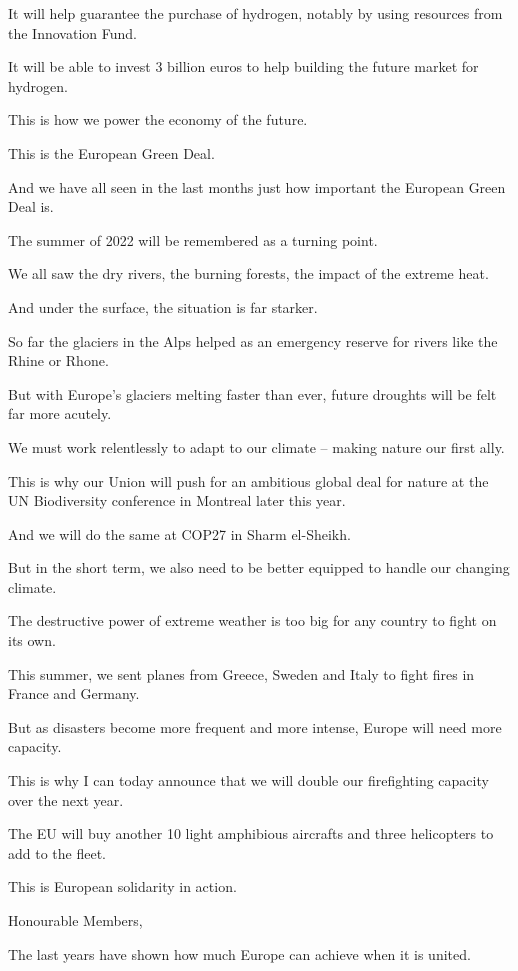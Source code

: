 \documentclass[a4paper,11pt]{article}
\begin{document}
It will help guarantee the purchase of hydrogen, notably by using resources from the Innovation Fund.

It will be able to invest 3 billion euros to help building the future market for hydrogen.

This is how we power the economy of the future.

This is the European Green Deal.

 

And we have all seen in the last months just how important the European Green Deal is.

The summer of 2022 will be remembered as a turning point.

We all saw the dry rivers, the burning forests, the impact of the extreme heat.

And under the surface, the situation is far starker.

So far the glaciers in the Alps helped as an emergency reserve for rivers like the Rhine or Rhone.

But with Europe's glaciers melting faster than ever, future droughts will be felt far more acutely.

We must work relentlessly to adapt to our climate – making nature our first ally.

This is why our Union will push for an ambitious global deal for nature at the UN Biodiversity conference in Montreal later this year.

And we will do the same at COP27 in Sharm el-Sheikh.

But in the short term, we also need to be better equipped to handle our changing climate.

The destructive power of extreme weather is too big for any country to fight on its own.

This summer, we sent planes from Greece, Sweden and Italy to fight fires in France and Germany.

But as disasters become more frequent and more intense, Europe will need more capacity.

This is why I can today announce that we will double our firefighting capacity over the next year.

The EU will buy another 10 light amphibious aircrafts and three helicopters to add to the fleet.

This is European solidarity in action.

 

Honourable Members,

The last years have shown how much Europe can achieve when it is united.
\end{document}
